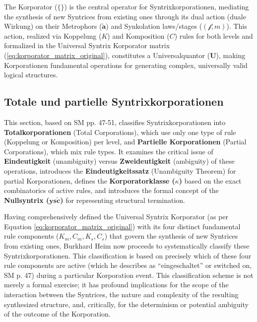 \documentclass[12pt]{article}
\newcommand{\q}[1]{\enquote{#1}}
\newcommand{\metrophor}{\bm{\widetilde{a}}}
\newcommand{\synkolator}{\mathcal{f}}
\newcommand{\synkolationsstufe}{m}
\newcommand{\universalquantor}{\bm{U}}
\newcommand{\nullsyntrix}{\bm{ys\widetilde{c}}}
\begin{document}
The Korporator (\( \{ \} \)) is the central operator for Syntrixkorporationen, mediating the synthesis of new Syntrices from existing ones through its dual action (duale Wirkung) on their Metrophors (\(\metrophor\)) and Synkolation laws/stages (\((\synkolator, \synkolationsstufe)\)). This action, realized via Koppelung (\(K\)) and Komposition (\(C\)) rules for both levels and formalized in the Universal Syntrix Korporator matrix (\eqref{eq:korporator_matrix_original}), constitutes a Universalquantor (\(\universalquantor\)), making Korporationen fundamental operations for generating complex, universally valid logical structures.

\subsection{Totale und partielle Syntrixkorporationen}
\label{sec:total_partial_korp}

This section, based on SM pp. 47-51, classifies Syntrixkorporationen into \textbf{Totalkorporationen} (Total Corporations), which use only one type of rule (Koppelung or Komposition) per level, and \textbf{Partielle Korporationen} (Partial Corporations), which mix rule types. It examines the critical issue of \textbf{Eindeutigkeit} (unambiguity) versus \textbf{Zweideutigkeit} (ambiguity) of these operations, introduces the \textbf{Eindeutigkeitssatz} (Unambiguity Theorem) for partial Korporationen, defines the \textbf{Korporatorklasse (\(\kappa\))} based on the exact combinatorics of active rules, and introduces the formal concept of the \textbf{Nullsyntrix (\(\nullsyntrix\))} for representing structural termination.

Having comprehensively defined the Universal Syntrix Korporator (as per Equation \eqref{eq:korporator_matrix_original}) with its four distinct fundamental rule components (\( K_m, C_m, K_s, C_s \)) that govern the synthesis of new Syntrices from existing ones, Burkhard Heim now proceeds to systematically classify these Syntrixkorporationen. This classification is based on precisely which of these four rule components are active (which he describes as \q{eingeschaltet} or switched on, SM p. 47) during a particular Korporation event. This classification scheme is not merely a formal exercise; it has profound implications for the scope of the interaction between the Syntrices, the nature and complexity of the resulting synthesized structure, and, critically, for the determinism or potential ambiguity of the outcome of the Korporation.
\end{document}

